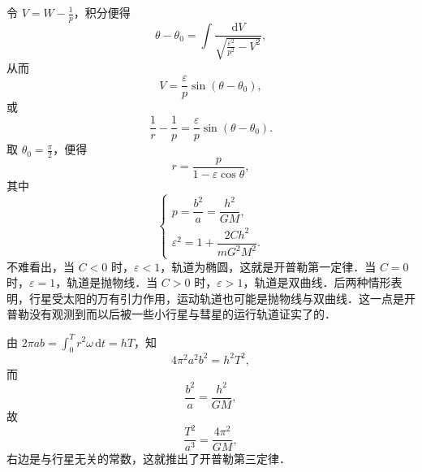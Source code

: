 令 $V = W - \frac{1}{p}$，积分便得
\[
\theta - \theta_0 = \int \frac{\mathrm{d}V}{\sqrt{\frac{\varepsilon^2}{p^2} - V^2}},
\]
从而
\[
V = \frac{\varepsilon}{p}\sin(\theta - \theta_0),
\]
或
\[
\frac{1}{r} - \frac{1}{p} = \frac{\varepsilon}{p}\sin(\theta - \theta_0).
\]
取 $\theta_0 = \frac{\pi}{2}$，便得
\[
r = \frac{p}{1 - \varepsilon\cos\theta},
\]
其中
\[
\begin{cases}
p = \dfrac{b^2}{a} = \dfrac{h^2}{G M},\\[8pt]
\varepsilon^2 = 1 + \dfrac{2C h^2}{m G^2 M^2}.
\end{cases}
\]
不难看出，当 $C < 0$ 时，$\varepsilon < 1$，轨道为椭圆，这就是开普勒第一定律．当 $C = 0$ 时，$\varepsilon = 1$，轨道是抛物线．当 $C > 0$ 时，$\varepsilon > 1$，轨道是双曲线．后两种情形表明，行星受太阳的万有引力作用，运动轨道也可能是抛物线与双曲线．这一点是开普勒没有观测到而以后被一些小行星与彗星的运行轨道证实了的．

由 $2\pi a b = \int_0^T r^2\omega\,\mathrm{d}t = hT$，知
\[
4\pi^2 a^2 b^2 = h^2 T^2,
\]
而
\[
\frac{b^2}{a} = \frac{h^2}{G M},
\]
故
\[
\frac{T^2}{a^3} = \frac{4\pi^2}{G M},
\]
右边是与行星无关的常数，这就推出了开普勒第三定律．
